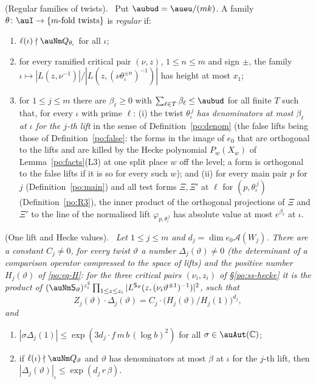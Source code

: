 \documentclass[10pt]{amsart}
\theoremstyle{definition}
\theoremstyle{remark}
\newcommand{\C}{\mathbb C}
\newenvironment{quotedthm}[2]{\par\medskip\noindent\begingroup
  \textbf{#1}#2.\ \itshape\ignorespaces}{\endgroup\par\medskip}
\newenvironment{quoteddef}[2]{\par\medskip\noindent\begingroup
  \textbf{#1}#2.\ \ignorespaces}{\endgroup\par\medskip}
\begin{document}
\begin{quoteddef}{\cite[Definition~14.39]{P46}}{ (Regular families of twists)}
Put $\aubud=\aueu/(mk)$. A family $\theta\colon\auI\to\{m\text{-fold twists}\}$ is \emph{regular}
if:
\begin{enumerate}
\item[(R1)] $\ell(\iota)\nmid\auNm Q_{\theta_\iota}$ for all $\iota$;
\item[(R2)] for every ramified critical pair $(\nu,z)$, $1\le n\le m$ and sign $\pm$, the family
$\iota\mapsto|L(z,\nu^{-1})|/|L(z,(\nu\theta_\iota^{\pm n})^{-1})|$ has height at most $x_1$;
\item[(R3)] for $1\le j\le m$ there are $\beta_\ell\ge0$ with $\sum_{\ell\in T}\beta_\ell\le
\aubud$ for all finite $T$ such that, for every $\iota$ with prime $\ell$: (i) the twist
$\theta_\iota^{\,j}$ \emph{has denominators at most $\beta_\ell$ at $\iota$ for the $j$-th lift}
in the sense of Definition~\ref{po:denom} (the false lifts being those of
Definition~\ref{po:false}: the forms in the image of $e_0$ that are orthogonal to the lifts and
are killed by the Hecke polynomial $P_w(X_w)$ of Lemma~\ref{po:facts}(L3) at one split place $w$
off the level; a form is orthogonal to the false lifts if it is so for every such $w$); and (ii)
for every main pair $p$ for $j$ (Definition~\ref{po:main}) and all test forms $\Xi,\Xi'$ at
$\ell$ for $(p,\theta_\iota^{\,j})$ (Definition~\ref{po:R3}), the inner product of the orthogonal
projections of $\Xi$ and $\Xi'$ to the line of the normalised lift
$\varphi_{p,\theta_\iota^{\,j}}$ has absolute value at most $e^{\beta_\ell}$ at $\iota$.
\end{enumerate}
\end{quoteddef}

\begin{quotedthm}{\cite[Proposition~14.41]{P46}}{ (One lift and Hecke values)}
Let $1\le j\le m$ and $d_j=\dim e_0\mathcal A(W_j)$. There are a constant $C_j\ne0$, for every twist
$\vartheta$ a number $\Delta_j(\vartheta)\ne0$ (the determinant of a \emph{comparison operator}
compressed to the space of lifts) and the positive number $H_j(\vartheta)$ of \eqref{po:eq-H}: for the three critical pairs $(\nu_i,z_i)$ of \S\ref{po:ss-hecke} it is the product of $(\auNm\mathsf S_\vartheta)^{z_i^2}\prod_{1\le z\le z_i}|L^{\mathsf S_\vartheta}(z,(\nu_i\vartheta^{\pm1})^{-1})|^2$, such that
\[
Z_j(\vartheta)\cdot\Delta_j(\vartheta)=C_j\cdot\bigl(H_j(\vartheta)/H_j(1)\bigr)^{d_j},
\]
and
\begin{enumerate}
\item[(a)] $|\sigma\Delta_j(1)|\le\exp(3d_j\cdot f\,m\,b\,(\log b)^2)$ for all
$\sigma\in\auAut(\C)$;
\item[(b)] if $\ell(\iota)\nmid\auNm Q_\vartheta$ and $\vartheta$ has denominators at most $\beta$
at $\iota$ for the $j$-th lift, then $|\Delta_j(\vartheta)|_\iota\le\exp(d_j\,r\,\beta)$.
\end{enumerate}
\end{quotedthm}
\end{document}
